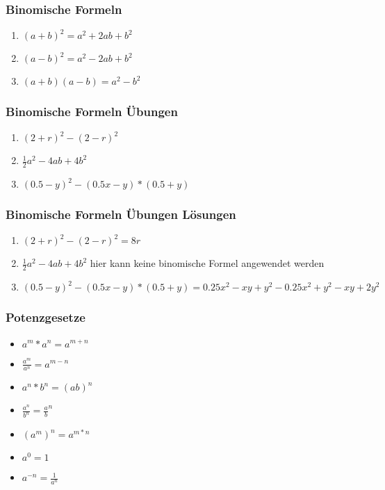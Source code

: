\begin{frame}
    \frametitle{Binomische Formeln}
    \begin{enumerate}
        \vfill \item $(a+b)^2 = a^2 + 2ab + b^2$
        \vfill \item $(a-b)^2 = a^2 - 2ab + b^2$
        \vfill \item $(a+b)(a-b) = a^2 - b^2$
    \end{enumerate}
\end{frame}

\begin{frame}
    \frametitle{Binomische Formeln Übungen}
    \begin{enumerate}
        \vfill \item $(2+r)^2 - (2-r)^2$
        \vfill \item $\frac{1}{2}a^2 - 4ab + 4b^2$
        \vfill \item $(0.5-y)^2 - (0.5x - y)*(0.5 + y)$
    \end{enumerate}
\end{frame}

\begin{frame}
    \frametitle{Binomische Formeln Übungen Lösungen}
    \begin{enumerate}
        \vfill \item $(2+r)^2 - (2-r)^2 = 8r$
        \vfill \item $\frac{1}{2}a^2 - 4ab + 4b^2$ hier kann keine binomische Formel angewendet werden
        \vfill \item $(0.5-y)^2 - (0.5x - y)*(0.5 + y) = 0.25x^2 -xy +y^2-0.25x^2+y^2 -xy+2y^2$
    \end{enumerate}
\end{frame}


\begin{frame}
    \frametitle{Potenzgesetze}
	\begin{itemize}
		\vfill \item $a^m * a^n = a^{m+n}$
		\vfill \item $\frac{a^m}{a^n} = a^{m-n}$
		\vfill \item $a^n * b^n = (ab)^n$
		\vfill \item $\frac{a^n}{b^n} = \frac{a}{b}^n$
		\vfill \item $(a^m)^n = a^{m*n}$
		\vfill \item $a^0 = 1$
		\vfill \item $a^{-n} = \frac{1}{a^n}$
	\end{itemize}
\end{frame}


